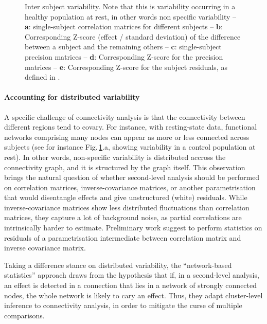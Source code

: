 \documentclass[5p]{elsarticle}
\begin{document}
\begin{figure}
\caption{Inter subject variability. Note that this is variability
occurring in a healthy population at rest, in other words non specific
variability -- \textbf{a}: single-subject
correlation matrices for different subjects -- \textbf{b}:
Corresponding Z-score (effect / standard deviation) of the difference
between a subject and the remaining others -- \textbf{c}:
single-subject precision matrices -- \textbf{d}: Corresponding Z-score
for the precision matrices -- \textbf{e}:
Corresponding Z-score for the subject residuals, as defined in 
\cite{varoquaux2010b}.
\label{fig:inter_subject}}
\end{figure}

\paragraph{Accounting for distributed variability}
%
A specific challenge of connectivity analysis is that the connectivity
between different regions tend to covary. For instance, with
resting-state data, functional networks comprising many nodes can appear
as more or less connected across subjects (see for instance
Fig.\,\ref{fig:inter_subject}.a, showing variability in a control
population at rest). In other words, non-specific variability is
distributed accross the connectivity graph, and it is structured by the
graph itself. This observation brings the natural question of whether
second-level analysis should be performed on correlation matrices,
inverse-covariance matrices, or another parametrisation that would
disentangle effects and give unstructured (white) residuals. While
inverse-covariance matrices show less distributed fluctuations than
correlation matrices, they capture a lot of background noise, as partial
correlations are intrinsically harder to estimate. Preliminary work
\cite{varoquaux2010b} suggest to perform statistics on residuals of
a parametrisation intermediate between correlation matrix and inverse
covariance matrix.

Taking a difference stance on distributed variability, the ``network-based
statistics'' approach \cite{zalesky2010} draws from the hypothesis that
if, in a second-level analysis, an effect is detected in a connection
that lies in a network of strongly connected nodes, the whole network is
likely to cary an effect. Thus, they adapt cluster-level inference to
connectivity analysis, in order to mitigate the curse of multiple
comparisons.
\end{document}
